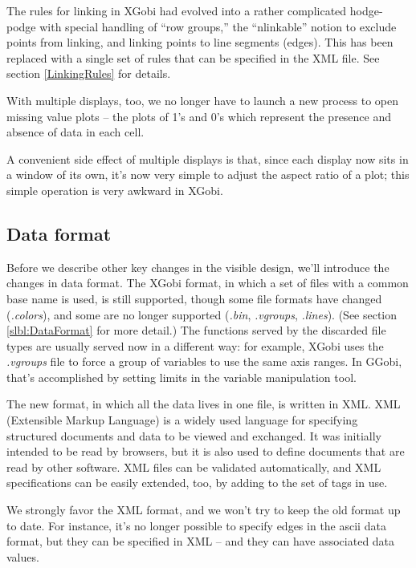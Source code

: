 \documentclass[11pt]{article}
\def\File#1{\textsl{#1}}
\begin{document}
{The rules for linking in XGobi had evolved into a rather complicated
hodge-podge with special handling of ``row groups,'' the
``nlinkable'' notion to exclude points from linking, and linking
points to line segments (edges).  This has been replaced with a single set
of rules that can be specified in the XML file.  See section 
\ref{LinkingRules} for details.

With multiple displays, too, we no longer have to launch a new
process to open missing value plots -- the plots of 1's and 0's
which represent the presence and absence of data in each cell.

A convenient side effect of multiple displays is that, since each
display now sits in a window of its own, it's now very simple to
adjust the aspect ratio of a plot; this simple operation is very
awkward in XGobi.

\subsection {Data format}

Before we describe other key changes in the visible design, we'll
introduce the changes in data format.  The XGobi format, in which a
set of files with a common base name is used, is still supported,
though some file formats have changed (\File{.colors}), and some are no
longer supported (\File{.bin}, \File{.vgroups}, \File{.lines}).  (See
section \ref{slbl:DataFormat} for more detail.) The functions served
by the discarded file types are usually served now in a different
way:  for example, XGobi uses the \File{.vgroups} file to force
a group of variables to use the same axis ranges.  In GGobi, that's
accomplished by setting limits in the variable manipulation tool.

The new format, in which all the data lives in one file, is written
in XML.  XML (Extensible Markup Language) is a widely used language
for specifying structured documents and data to be viewed and
exchanged.  It was initially intended to be read by browsers, but it
is also used to define documents that are read by other software.
XML files can be validated automatically, and XML specifications can
be easily extended, too, by adding to the set of tags in use.

We strongly favor the XML format, and we won't try to keep the
old format up to date.  For instance, it's no longer possible
to specify edges in the ascii data format, but they can be specified in
XML -- and they can have associated data values.

}
\end{document}
